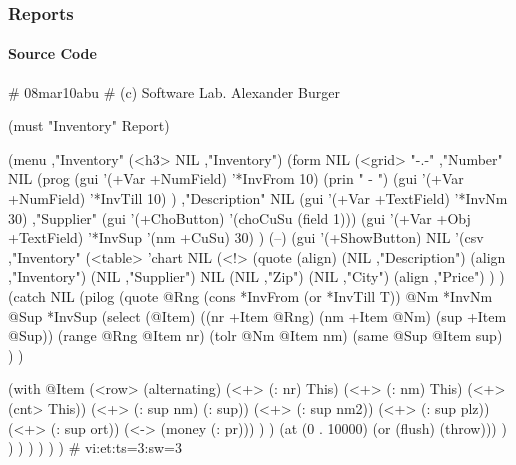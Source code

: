 \subsubsection{ Reports}
\label{sec:appl-devel-reports}%

\paragraph{Source Code}
\label{sec:appl-devel-reports-source-code}


\begin{wideverbatim}

# 08mar10abu
# (c) Software Lab. Alexander Burger

(must "Inventory" Report)

(menu ,"Inventory"
   (<h3> NIL ,"Inventory")
   (form NIL
      (<grid> "-.-"
         ,"Number" NIL
         (prog
            (gui '(+Var +NumField) '*InvFrom 10)
            (prin " - ")
            (gui '(+Var +NumField) '*InvTill 10) )
         ,"Description" NIL (gui '(+Var +TextField) '*InvNm 30)
         ,"Supplier" (gui '(+ChoButton) '(choCuSu (field 1)))
         (gui '(+Var +Obj +TextField) '*InvSup '(nm +CuSu) 30) )
      (--)
      (gui '(+ShowButton) NIL
         '(csv ,"Inventory"
            (<table> 'chart NIL
               (<!>
                  (quote
                     (align)
                     (NIL ,"Description")
                     (align ,"Inventory")
                     (NIL ,"Supplier")
                     NIL
                     (NIL ,"Zip")
                     (NIL ,"City")
                     (align ,"Price") ) )
               (catch NIL
                  (pilog
                     (quote
                        @Rng (cons *InvFrom (or *InvTill T))
                        @Nm *InvNm
                        @Sup *InvSup
                        (select (@Item)
                           ((nr +Item @Rng) (nm +Item @Nm) (sup +Item @Sup))
                           (range @Rng @Item nr)
                           (tolr @Nm @Item nm)
                           (same @Sup @Item sup) ) )

\end{wideverbatim}

\begin{wideverbatim}
                     (with @Item
                        (<row> (alternating)
                           (<+> (: nr) This)
                           (<+> (: nm) This)
                           (<+> (cnt> This))
                           (<+> (: sup nm) (: sup))
                           (<+> (: sup nm2))
                           (<+> (: sup plz))
                           (<+> (: sup ort))
                           (<-> (money (: pr))) ) )
                     (at (0 . 10000) (or (flush) (throw))) ) ) ) ) ) ) )
# vi:et:ts=3:sw=3
\end{wideverbatim}


